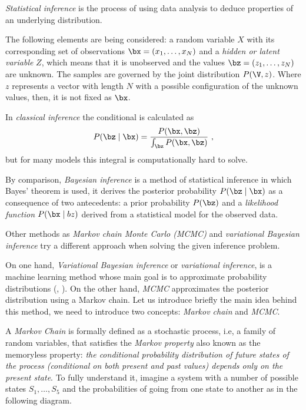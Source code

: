 
\emph{Statistical inference} is the process of using data analysis to deduce properties of an underlying distribution.

The following elements are being considered: a random variable \(X\) with its corresponding set of observations \(\bx = (x_{1},\dots, x_{N})\) and a \emph{hidden or latent variable} \(Z\), which means that it is unobserved and the values \(\bz = (z_{1}, \dots, z_{N})\) are unknown. The samples are governed by the joint distribution \(P(\V, z)\). Where \(z\) represents a vector with length \(N\) with a possible configuration of the unknown values, then, it is not fixed as \(\bx\).

In \emph{classical inference} the conditional is calculated as
\[
  P(\bz \mid \bx) = \frac{P(\bx, \bz)}{\int_{\bz} P(\bx,\bz)}\ ,
\]
but for many models this integral is computationally hard to solve.

By comparison, \emph{Bayesian inference} is a method of statistical inference in which Bayes' theorem is used, it derives the posterior probability \(P(\bz \mid \bx)\) as a consequence of two antecedents: a prior probability \(P(\bz)\) and a \emph{likelihood function} \(P(\bx \mid bz)\)  derived from a statistical model for the observed data.

Other methods as \emph{Markov chain Monte Carlo (MCMC)} and \emph{variational Bayesian inference} try a different approach when solving the given inference problem.

On one hand, \emph{Variational Bayesian inference} or \emph{variational inference}, is a machine learning method whose main goal is to approximate probability distributions (\cite{jordan1999introduction}, \cite{wainwright}). On the other hand, \emph{MCMC} approximates the posterior distribution using a Markov chain. Let us introduce briefly the main idea behind this method, we need to introduce two concepts: \emph{Markov chain} and \emph{MCMC}.

A \emph{Markov Chain} is formally defined as a stochastic process, i.e, a family of random variables, that satisfies the \emph{Markov property} also known as the memoryless property: \textit{the conditional probability distribution of future states of the process (conditional on both present and past values) depends only on the present state}. To fully understand it, imagine a system with a number of possible states \(S_{1},\dots,S_{5}\) and the probabilities of going from one state to another as in the following diagram.

